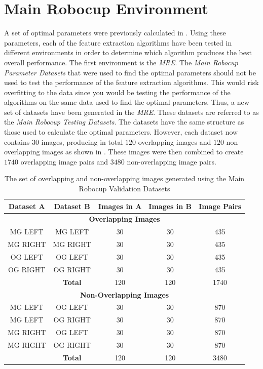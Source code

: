 \documentclass[11pt]{report}
\begin{document}
\section{Main Robocup Environment}
\label{sec:mrdPerformance}
A set of optimal parameters were previously calculated in . Using these parameters, each of the feature extraction algorithms have been tested in different environments in order to determine which algorithm produces the best overall performance. The first environment is the \textit{MRE}. The \textit{Main Robocup Parameter Datasets} that were used to find the optimal parameters should not be used to test the performance of the feature extraction algorithms. This would risk overfitting to the data since you would be testing the performance of the algorithms on the same data used to find the optimal parameters. Thus, a new set of datasets have been generated in the \textit{MRE}. These datasets are referred to as the \textit{Main Robocup Testing Datasets}. The datasets have the same structure as those used to calculate the optimal parameters. However, each dataset now contains $30$ images, producing in total $120$ overlapping images and $120$ non-overlapping images as shown in . These images were then combined to create $1740$ overlapping image pairs and $3480$ non-overlapping image pairs.\\

\begin{table}
\caption{The set of overlapping and non-overlapping images generated using
the Main Robocup Validation Datasets}
\begin{tabular}{|c|c|c|c|c|}
\hline 
\textbf{Dataset A} & \textbf{Dataset B} & \textbf{Images in A} & \textbf{Images in B} & \textbf{Image Pairs}\tabularnewline
\hline 
\hline 
\multicolumn{5}{|c}{\textbf{Overlapping Images}}\tabularnewline
\hline 
MG LEFT & MG LEFT & 30 & 30 & 435\tabularnewline
\hline 
MG RIGHT & MG RIGHT & 30 & 30 & 435\tabularnewline
\hline 
OG LEFT & OG LEFT & 30 & 30 & 435\tabularnewline
\hline 
OG RIGHT & OG RIGHT & 30 & 30 & 435\tabularnewline
\hline 
 & \textbf{Total} & 120 & 120 & 1740\tabularnewline
\hline 
\multicolumn{5}{|c}{\textbf{Non-Overlapping Images}}\tabularnewline
\hline 
MG LEFT & OG LEFT & 30 & 30 & 870\tabularnewline
\hline 
MG LEFT & OG RIGHT & 30 & 30 & 870\tabularnewline
\hline 
MG RIGHT & OG LEFT & 30 & 30 & 870\tabularnewline
\hline 
MG RIGHT & OG RIGHT & 30 & 30 & 870\tabularnewline
\hline 
 & \textbf{Total} & 120 & 120 & 3480\tabularnewline
\hline 
\end{tabular}
\label{tab:mrtd}
\end{table}
\end{document}
